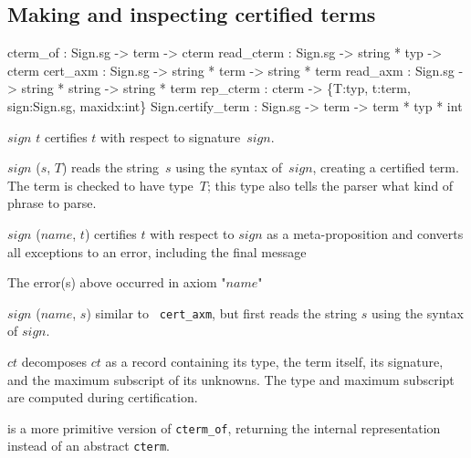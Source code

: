 \subsection{Making and inspecting certified terms}
\begin{ttbox}
cterm_of       : Sign.sg -> term -> cterm
read_cterm     : Sign.sg -> string * typ -> cterm
cert_axm       : Sign.sg -> string * term -> string * term
read_axm       : Sign.sg -> string * string -> string * term
rep_cterm      : cterm -> \{T:typ, t:term, sign:Sign.sg, maxidx:int\}
Sign.certify_term : Sign.sg -> term -> term * typ * int
\end{ttbox}
\begin{ttdescription}
  
\item[\ttindexbold{cterm_of} $sign$ $t$]  certifies
  $t$ with respect to signature~$sign$.
  
\item[\ttindexbold{read_cterm} $sign$ ($s$, $T$)] reads the string~$s$
  using the syntax of~$sign$, creating a certified term.  The term is
  checked to have type~$T$; this type also tells the parser what kind
  of phrase to parse.
  
\item[\ttindexbold{cert_axm} $sign$ ($name$, $t$)] certifies $t$ with
  respect to $sign$ as a meta-proposition and converts all exceptions
  to an error, including the final message
\begin{ttbox}
The error(s) above occurred in axiom "\(name\)"
\end{ttbox}

\item[\ttindexbold{read_axm} $sign$ ($name$, $s$)] similar to {\tt
    cert_axm}, but first reads the string $s$ using the syntax of
  $sign$.
  
\item[\ttindexbold{rep_cterm} $ct$] decomposes $ct$ as a record
  containing its type, the term itself, its signature, and the maximum
  subscript of its unknowns.  The type and maximum subscript are
  computed during certification.
  
\item[\ttindexbold{Sign.certify_term}] is a more primitive version of
  \texttt{cterm_of}, returning the internal representation instead of
  an abstract \texttt{cterm}.

\end{ttdescription}


